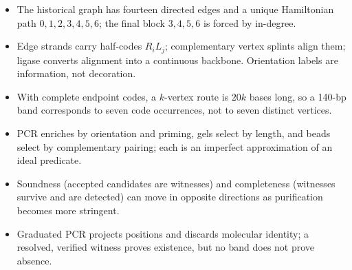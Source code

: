 \begin{KeyIdeas}
\begin{itemize}\setlength{\itemsep}{2pt}
\item The historical graph has fourteen directed edges and a unique Hamiltonian
path $0,1,2,3,4,5,6$; the final block $3,4,5,6$ is forced by in-degree.
\item Edge strands carry half-codes $R_iL_j$; complementary vertex splints align
them; ligase converts alignment into a continuous backbone. Orientation labels
are information, not decoration.
\item With complete endpoint codes, a $k$-vertex route is $20k$ bases long, so a
140-bp band corresponds to seven code occurrences, not to seven distinct
vertices.
\item PCR enriches by orientation and priming, gels select by length, and beads
select by complementary pairing; each is an imperfect approximation of an ideal
predicate.
\item Soundness (accepted candidates are witnesses) and completeness (witnesses
survive and are detected) can move in opposite directions as purification
becomes more stringent.
\item Graduated PCR projects positions and discards molecular identity; a
resolved, verified witness proves existence, but no band does not prove
absence.
\end{itemize}
\end{KeyIdeas}

